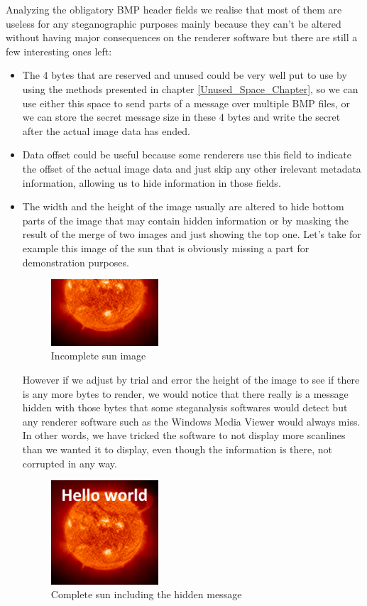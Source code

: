 \begin{multicols}{2}
Analyzing the obligatory BMP header fields we realise that most of them are useless for any steganographic purposes mainly because they can't be altered without having major consequences on the renderer software but there are still a few interesting ones left:
\begin{itemize}
  \item The 4 bytes that are reserved and unused could be very well put to use by using the methods presented in chapter \ref{Unused_Space_Chapter}, so we can use either this space to send parts of a message over multiple BMP files, or we can store the secret message size in these 4 bytes and write the secret after the actual image data has ended.
  \item Data offset could be useful because some renderers use this field to indicate the offset of the actual image data and just skip any other irelevant metadata information, allowing us to hide information in those fields.
  \item The width and the height of the image usually are altered to hide bottom parts of the image that may contain hidden information or by masking the result of the merge of two images and just showing the top one. Let's take for example this image of the sun that is obviously missing a part for demonstration purposes.

\begin{figure}[H]
    \centering
    \includegraphics[width=4cm,keepaspectratio]{pics/height_modification_steganography_cut}
    \caption{Incomplete sun image}
    \label{Sun_Missing_Part}
\end{figure}

However if we adjust by trial and error the height of the image to see if there is any more bytes to render, we would notice that there really is a message hidden with those bytes that some steganalysis softwares would detect but any renderer software such as the Windows Media Viewer would always miss. In other words, we have tricked the software to not display more scanlines than we wanted it to display, even though the information is there, not corrupted in any way.

\begin{figure}[H]
    \centering
    \includegraphics[width=4cm,keepaspectratio]{pics/height_modification_steganography_original}
    \caption{Complete sun including the hidden message}
    \label{Sun_Original}
\end{figure}
\end{itemize}


\end{multicols}
